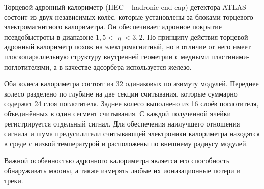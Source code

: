 Торцевой адронный калориметр (HEC -- hadronic end-cap) детектора ATLAS состоит из двух независимых колёс, которые установлены за блоками торцевого электромагнитного калориметра. Он обеспечивает адронное покрытие псевдобыстроты в диапазоне $1,5 < |\eta| < 3,2$. По принципу действия торцевой адронный калориметр похож на электромагнитный, но в отличие от него имеет плоскопараллельную структуру внутренней геометрии с медными пластинами-поглотителями, а в качестве адсорбера используется железо.\par
Оба колеса калориметра состоят из 32 одинаковых по азимуту модулей. Переднее колесо разделено по глубине на две секции считывания, которые суммарно содержат 24 слоя поглотителя. Заднее колесо выполнено из 16 слоёв поглотителя, объединённых в один сегмент считывания. С каждой полученной ячейки регистрируется отдельный сигнал. Для обеспечения наилучшего отношения сигнала и шума предусилители считывающей электроники калориметра находятся в среде с низкой температурой и расположены по внешнему радиусу модулей.\par
Важной особенностью адронного калориметра является его способность обнаруживать мюоны, а также измерять любые их ионизационные потери и треки.\par
